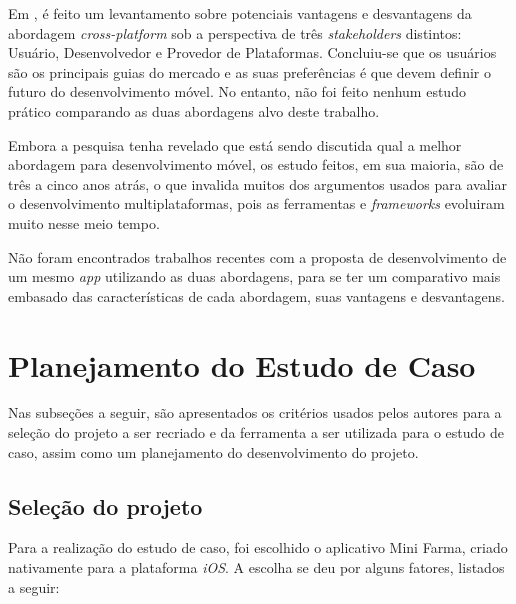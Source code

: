 Em , é feito um levantamento sobre potenciais vantagens e desvantagens da abordagem \textit{cross-platform} sob a 
perspectiva de três \textit{stakeholders} distintos: Usuário, Desenvolvedor e Provedor de Plataformas. Concluiu-se que os usuários são os principais
guias do mercado e as suas preferências é que devem definir o futuro do desenvolvimento móvel. No entanto, não foi feito nenhum estudo prático comparando
as duas abordagens alvo deste trabalho.

Embora a pesquisa tenha revelado que está sendo discutida qual a melhor abordagem para desenvolvimento móvel, os estudo feitos, em sua maioria, são de três a cinco 
anos atrás, o que invalida muitos dos argumentos usados para avaliar o desenvolvimento multiplataformas, pois as ferramentas e \textit{frameworks} evoluiram muito nesse
meio tempo. 

Não foram encontrados trabalhos recentes com a proposta de desenvolvimento de um mesmo \textit{app} utilizando as duas abordagens, para se ter um comparativo mais embasado das
características de cada abordagem, suas vantagens e desvantagens.
 
\begin{comment}
Falar que tem mt trabalho comparativo de nativo e cross, mas não refletem a atualidades, pois mudou muito em poucos anos.
e nao ha um estudo comparativo
tenho 3 plataformas, o cross surgiu como uma solucao, e queremos confirmar se eh mesmo uma solucao
da pra confiar nessa abordagem pra todos os desenvolvimentos de apps?    
\end{comment}

\section{Planejamento do Estudo de Caso} \label{section:planejamentoestudodecaso}

Nas subseções a seguir, são apresentados os critérios usados pelos autores para a seleção do projeto a ser recriado e da ferramenta a ser utilizada para o estudo de caso, assim como um planejamento
do desenvolvimento do projeto.

\subsection{Seleção do projeto} \label{subsection:selecaodoprojeto}

Para a realização do estudo de caso, foi escolhido o aplicativo Mini Farma, criado nativamente para a plataforma \textit{iOS}. A escolha se deu por alguns fatores, listados a seguir:

